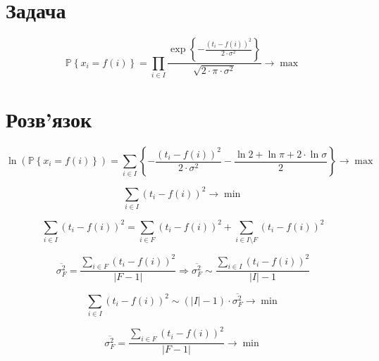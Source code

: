\section{Задача}

\begin{equation*}
  \mathbb{P}\left\{ x_i = f\left( i \right) \right\}
  = \prod_{i \in I}
    \frac{\exp{\left\{- \frac{\left( t_i - f\left( i \right) \right)^2}
         {2 \cdot \sigma^2} \right\}}}{\sqrt{2 \cdot \pi \cdot \sigma^2}}
  \to \max
\end{equation*}

\section{Розв'язок}

\begin{equation*}
  \ln{\left(\mathbb{P}\left\{ x_i = f\left( i \right) \right\}\right)}
  = \sum_{i \in I}
    \left\{
      - \frac{\left( t_i - f\left( i \right) \right)^2}{2 \cdot \sigma^2}
      - \frac{\ln{2} + \ln{\pi} + 2 \cdot \ln{\sigma}}{2}
    \right\}
  \to \max
\end{equation*}

\begin{equation*}
  \sum_{i \in I} \left( t_i - f\left( i \right) \right)^2 \to \min
\end{equation*}

\begin{equation*}
  \sum_{i \in I} \left( t_i - f\left( i \right) \right)^2
  = \sum_{i \in F} \left( t_i - f\left( i \right) \right)^2
  + \sum_{i \in I \setminus F} \left( t_i - f\left( i \right) \right)^2
\end{equation*}

\begin{equation*}
    \overline{\sigma_F^2}
    = \frac{\sum\limits_{i \in F} \left( t_i - f\left( i \right) \right)^2}
           {\left| F - 1 \right|}
    \Rightarrow
    \overline{\sigma_F^2}
    \sim \frac{\sum\limits_{i \in I}
                 \left( t_i - f\left( i \right) \right)^2}
               {\left| I \right| - 1}
\end{equation*}

\begin{equation*}
  \sum_{i \in I} \left( t_i - f\left( i \right) \right)^2
  \sim \left( \left| I \right| - 1 \right) \cdot \overline{\sigma_F^2}
  \to \min
\end{equation*}

\begin{equation*}
  \overline{\sigma_F^2}
  = \frac{\sum\limits_{i \in F} \left( t_i - f\left( i \right) \right)^2}
         {\left| F - 1 \right|}
  \to \min
\end{equation*}

